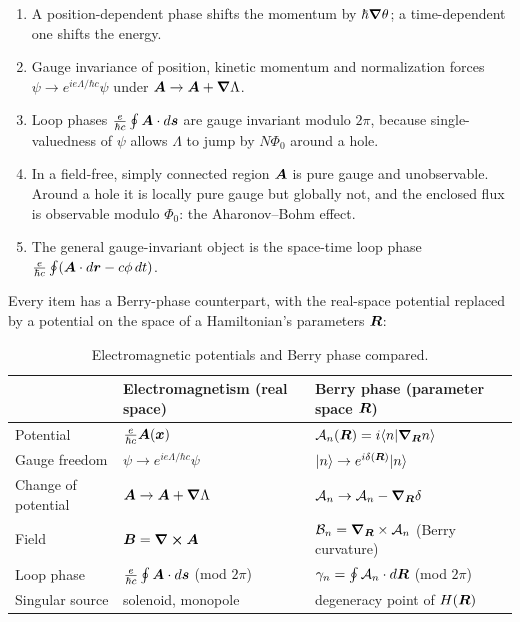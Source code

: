 \begin{fact}
\leavevmode
\begin{enumerate}
    \item A position-dependent phase shifts the momentum by $\hbar\grad\theta$; a time-dependent one shifts the energy.
    \item Gauge invariance of position, kinetic momentum and normalization forces $\psi\to e^{ie\Lambda/\hbar c}\psi$ under $\vect{A}\to\vect{A}+\grad\Lambda$.
    \item Loop phases $\frac{e}{\hbar c}\oint\vect{A}\cdot d\lvect{s}$ are gauge invariant modulo $2\pi$, because single-valuedness of $\psi$ allows $\Lambda$ to jump by $N\Phi_0$ around a hole.
    \item In a field-free, simply connected region $\vect{A}$ is pure gauge and unobservable. Around a hole it is locally pure gauge but globally not, and the enclosed flux is observable modulo $\Phi_0$: the Aharonov--Bohm effect.
    \item The general gauge-invariant object is the space-time loop phase $\frac{e}{\hbar c}\oint(\vect{A}\cdot d\lvect{r} - c\phi\,dt)$.
\end{enumerate}
\end{fact}

Every item has a Berry-phase counterpart, with the real-space potential replaced by a potential on the space of a Hamiltonian's parameters $\bm{R}$:

\begin{table}[ht]
\centering
\renewcommand{\arraystretch}{1.4}
\begin{tabular}{@{}lll@{}}
    \toprule
    & Electromagnetism (real space) & Berry phase (parameter space $\bm{R}$)\\
    \midrule
    Potential & $\frac{e}{\hbar c}\vect{A}(\lvect{x})$ & $\mathcal{A}_n(\bm{R}) = i\langle n|\grad_{\bm{R}}n\rangle$\\
    Gauge freedom & $\psi\to e^{ie\Lambda/\hbar c}\psi$ & $|n\rangle\to e^{i\delta(\bm{R})}|n\rangle$\\
    Change of potential & $\vect{A}\to\vect{A}+\grad\Lambda$ & $\mathcal{A}_n\to\mathcal{A}_n - \grad_{\bm{R}}\delta$\\
    Field & $\vect{B} = \curl\vect{A}$ & $\mathcal{B}_n = \grad_{\bm{R}}\times\mathcal{A}_n$ (Berry curvature)\\
    Loop phase & $\frac{e}{\hbar c}\oint\vect{A}\cdot d\lvect{s}$ (mod $2\pi$) & $\gamma_n = \oint\mathcal{A}_n\cdot d\bm{R}$ (mod $2\pi$)\\
    Singular source & solenoid, monopole & degeneracy point of $H(\bm{R})$\\
    \bottomrule
\end{tabular}
\caption{Electromagnetic potentials and Berry phase compared.}
\end{table}

